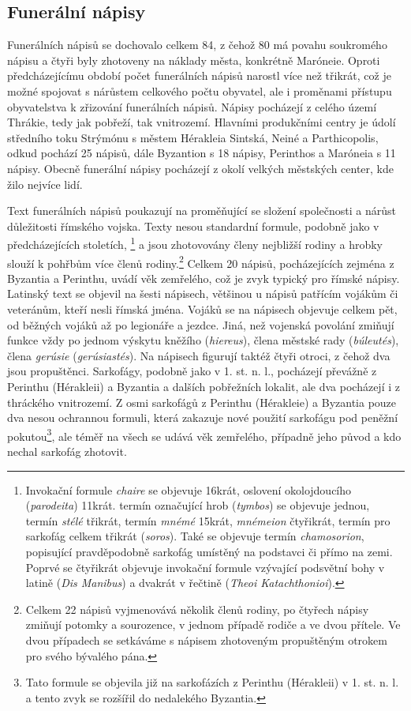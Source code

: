 
\subsection[funerální-nápisy-13]{Funerální nápisy}

Funerálních nápisů se dochovalo celkem 84, z čehož 80 má povahu soukromého nápisu a čtyři byly zhotoveny na náklady města, konkrétně Maróneie. Oproti předcházejícímu období počet funerálních nápisů narostl více než třikrát, což je možné spojovat s nárůstem celkového počtu obyvatel, ale i proměnami přístupu obyvatelstva k zřizování funerálních nápisů. Nápisy pocházejí z celého území Thrákie, tedy jak pobřeží, tak vnitrozemí. Hlavními produkčními centry je údolí středního toku Strýmónu s městem Hérakleia Sintská, Neiné a Parthicopolis, odkud pochází 25 nápisů, dále Byzantion s 18 nápisy, Perinthos a Maróneia s 11 nápisy. Obecně funerální nápisy pocházejí z okolí velkých městských center, kde žilo nejvíce lidí.

Text funerálních nápisů poukazují na proměňující se složení společnosti a nárůst důležitosti římského vojska. Texty nesou standardní formule, podobně jako v předcházejících stoletích, \footnote{Invokační formule {\em chaire} se objevuje 16krát, oslovení okolojdoucího ({\em parodeita}) 11krát. termín označující hrob ({\em tymbos}) se objevuje jednou, termín {\em stélé} třikrát, termín {\em mnémé} 15krát, {\em mnémeion} čtyřikrát, termín pro sarkofág celkem třikrát ({\em soros}). Také se objevuje termín {\em chamosorion}, popisující pravděpodobně sarkofág umístěný na podstavci či přímo na zemi. Poprvé se čtyřikrát objevuje invokační formule vzývající podsvětní bohy v latině ({\em Dis Manibus}) a dvakrát v řečtině ({\em Theoi Katachthonioi}).} a jsou zhotovovány členy nejbližší rodiny a hrobky slouží k pohřbům více členů rodiny.\footnote{Celkem 22 nápisů vyjmenovává několik členů rodiny, po čtyřech nápisy zmiňují potomky a sourozence, v jednom případě rodiče a ve dvou přítele. Ve dvou případech se setkáváme s nápisem zhotoveným propuštěným otrokem pro svého bývalého pána.} Celkem 20 nápisů, pocházejících zejména z Byzantia a Perinthu, uvádí věk zemřelého, což je zvyk typický pro římské nápisy. Latinský text se objevil na šesti nápisech, většinou u nápisů patřícím vojákům či veteránům, kteří nesli římská jména. Vojáků se na nápisech objevuje celkem pět, od běžných vojáků až po legionáře a jezdce. Jiná, než vojenská povolání zmiňují funkce vždy po jednom výskytu kněžího ({\em hiereus}), člena městské rady ({\em búleutés}), člena {\em gerúsie} ({\em gerúsiastés}). Na nápisech figurují taktéž čtyři otroci, z čehož dva jsou propuštěnci. Sarkofágy, podobně jako v 1. st. n. l., pocházejí převážně z Perinthu (Hérakleii) a Byzantia a dalších pobřežních lokalit, ale dva pocházejí i z thráckého vnitrozemí. Z osmi sarkofágů z Perinthu (Hérakleie) a Byzantia pouze dva nesou ochrannou formuli, která zakazuje nové použití sarkofágu pod peněžní pokutou\footnote{Tato formule se objevila již na sarkofázích z Perinthu (Hérakleii) v 1. st. n. l. a tento zvyk se rozšířil do nedalekého Byzantia.}, ale téměř na všech se udává věk zemřelého, případně jeho původ a kdo nechal sarkofág zhotovit.

